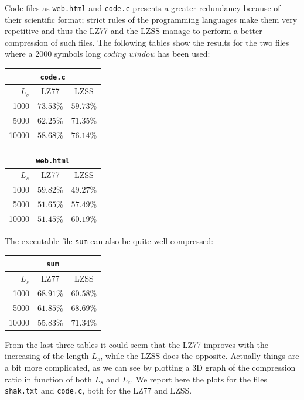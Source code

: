 Code files as \texttt{web.html} and \texttt{code.c} presents a greater redundancy because of their scientific format; strict rules of the programming languages make them very repetitive and thus the LZ77 and the LZSS manage to perform a better compression of such files. The following tables show the results for the two files where a $2000$ symbols long \textit{coding window} has been used:
\begin{center}
\begin{tabular}{r | c | c |}
\multicolumn{3}{c|}{\texttt{code.c}} \\
\hline
$L_s$ & LZ77 & LZSS \\ \hline
1000 & $73.53$\% & $59.73$\% \\
5000& $62.25$\% & $71.35$\% \\
10000& $58.68$\% & $76.14$\% \\
\hline
\end{tabular}

\vspace{0.5cm}

\begin{tabular}{r | c | c |}
\multicolumn{3}{c|}{\texttt{web.html}} \\
\hline
$L_s$ & LZ77 & LZSS \\ \hline
1000 & $59.82$\% & $49.27$\% \\
5000& $51.65$\% & $57.49$\% \\
10000& $51.45$\% & $60.19$\% \\
\hline
\end{tabular}
\end{center}

The executable file \texttt{sum} can also be quite well compressed:
\begin{center}
\begin{tabular}{r | c | c |}
\multicolumn{3}{c|}{\texttt{sum}} \\ 
\hline
$L_s$ & LZ77 & LZSS \\ \hline
1000 & $68.91$\% & $60.58$\% \\
5000& $61.85$\% & $68.69$\% \\
10000& $55.83$\% & $71.34$\% \\
\hline
\end{tabular}
\end{center}

From the last three tables it could seem that the LZ77 improves with the increasing of the length $L_s$, while the LZSS does the opposite. Actually things are a bit more complicated, as we can see by plotting a 3D graph of the compression ratio in function of both $L_s$ and $L_c$. We report here the plots for the files \texttt{shak.txt} and \texttt{code.c}, both for the LZ77 and LZSS. 

